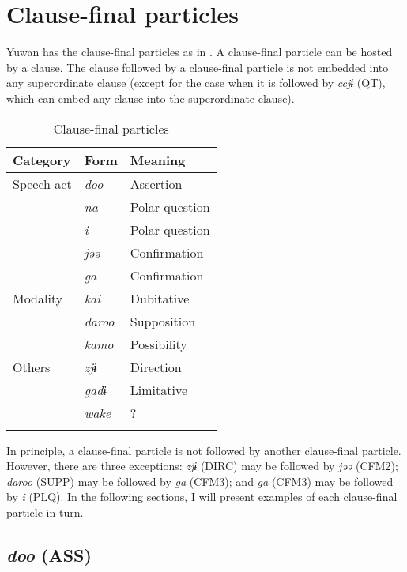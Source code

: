 \section{Clause-final particles}\label{sec:10.3}

Yuwan has the clause-final particles as in . A clause-final particle can be hosted by a clause. The clause followed by a clause-final particle is not embedded into any superordinate clause (except for the case when it is followed by \textit{ccjɨ} (QT), which can embed any clause into the superordinate clause).

\begin{table}
\caption{Clause-final particles\label{tab:99}}
\begin{tabular}{lll}
\lsptoprule
Category & Form & Meaning\\\midrule
Speech act & \textit{doo} &  Assertion\\
           & \textit{na}  &  Polar question\\
           & \textit{i}   &  Polar question\\
           & \textit{jəə} &  Confirmation\\
           & \textit{ga}  &  Confirmation\\
Modality   & \textit{kai} &  Dubitative\\
           & \textit{daroo} & Supposition\\
           & \textit{kamo}  & Possibility\\
Others     & \textit{zjɨ}   & Direction\\
           & \textit{gadɨ}  & Limitative\\
           & \textit{wake}  & ?\\\lspbottomrule
\end{tabular}
\end{table}

In principle, a clause-final particle is not followed by another clause-final particle. However, there are three exceptions: \textit{zjɨ} (DIRC) may be followed by \textit{jəə} (CFM2); \textit{daroo} (SUPP) may be followed by \textit{ga} (CFM3); and \textit{ga} (CFM3) may be followed by \textit{i} (PLQ). In the following sections, I will present examples of each clause-final particle in turn.

\subsection{\textit{doo} (ASS)}\label{sec:10.3.1}


